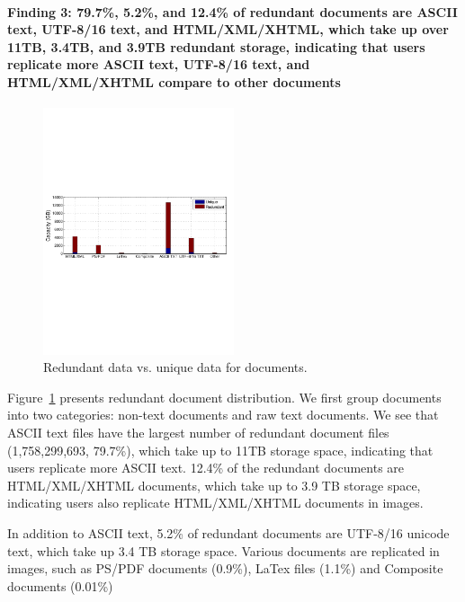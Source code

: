 \paragraph{Finding 3: 79.7\%, 5.2\%, and 12.4\% of redundant documents are ASCII text, UTF-8/16 text, and HTML/XML/XHTML, which take up over 11TB, 3.4TB, and 3.9TB redundant storage, indicating that users replicate more ASCII text, UTF-8/16 text, and HTML/XML/XHTML compare to other documents}

\begin{figure}
	\centering
	\includegraphics[width=0.5\textwidth]{graphs/type-utili-cap}
	\caption{Redundant data vs. unique data for documents.
	}
	\label{fig:type-doc}
\end{figure}

Figure~\ref{fig:type-doc} presents redundant document distribution. We first group documents into two categories: non-text documents and raw text documents. 
We see that ASCII text files have the largest number of redundant document files (1,758,299,693, 79.7\%), which take up to 11TB storage space, indicating that users replicate more ASCII text. 
12.4\% of the redundant documents are HTML/XML/XHTML documents, which take up to 3.9 TB storage space, indicating users also replicate HTML/XML/XHTML documents in images.  

In addition to ASCII text, 5.2\% of redundant documents are UTF-8/16 unicode text, which take up 3.4 TB storage space.
Various documents are replicated in images, such as PS/PDF documents (0.9\%), LaTex files (1.1\%) and Composite documents (0.01\%)


